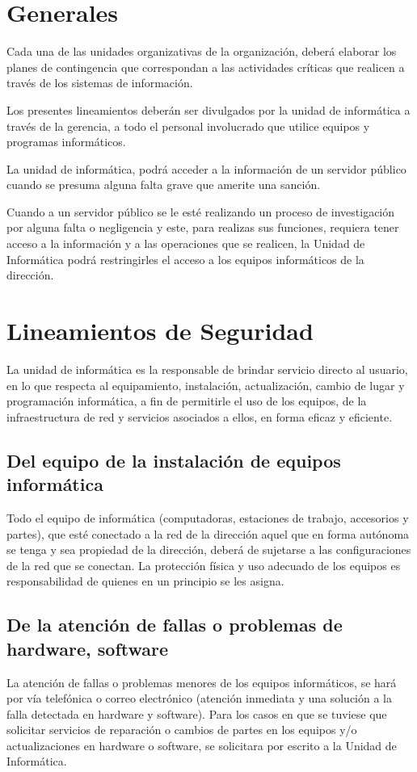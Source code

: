 \documentclass{book}
\begin{document}
    \chapter{Generales}
        Cada una de las unidades organizativas de la organización, deberá elaborar los
        planes de contingencia que correspondan a las actividades críticas que realicen a través
        de los sistemas de información.

        Los presentes lineamientos deberán ser divulgados por la unidad de informática
        a través de la gerencia, a todo el personal involucrado que utilice equipos y programas
        informáticos.

        La unidad de informática, podrá acceder a la información de un servidor público
        cuando se presuma alguna falta grave que amerite una sanción.

        Cuando a un servidor público se le esté realizando un proceso de investigación
        por alguna falta o negligencia y este, para realizas sus funciones, requiera tener acceso a
        la información y a las operaciones que se realicen, la Unidad de Informática podrá
        restringirles el acceso a los equipos informáticos de la dirección.
        \
    \chapter{Lineamientos de Seguridad}
        La unidad de informática es la responsable de brindar servicio directo al usuario,
        en lo que respecta al equipamiento, instalación, actualización, cambio de lugar y
        programación informática, a fin de permitirle el uso de los equipos, de la infraestructura
        de red y servicios asociados a ellos, en forma eficaz y eficiente.

        \section{Del equipo de la instalación de equipos informática}
            Todo el equipo de informática (computadoras, estaciones de trabajo, accesorios
            y partes), que esté conectado a la red de la dirección aquel que en forma autónoma se
            tenga y sea propiedad de la dirección, deberá de sujetarse a las configuraciones de la red
            que se conectan.
            La protección física y uso adecuado de los equipos es responsabilidad de quienes
            en un principio se les asigna.
        \

        \section{De la atención de fallas o problemas de hardware, software}
            La atención de fallas o problemas menores de los equipos informáticos, se hará
            por vía telefónica o correo electrónico (atención inmediata y una solución a la falla
            detectada en hardware y software). Para los casos en que se tuviese que solicitar
            servicios de reparación o cambios de partes en los equipos y/o actualizaciones en
            hardware o software, se solicitara por escrito a la Unidad de Informática.
\end{document}
